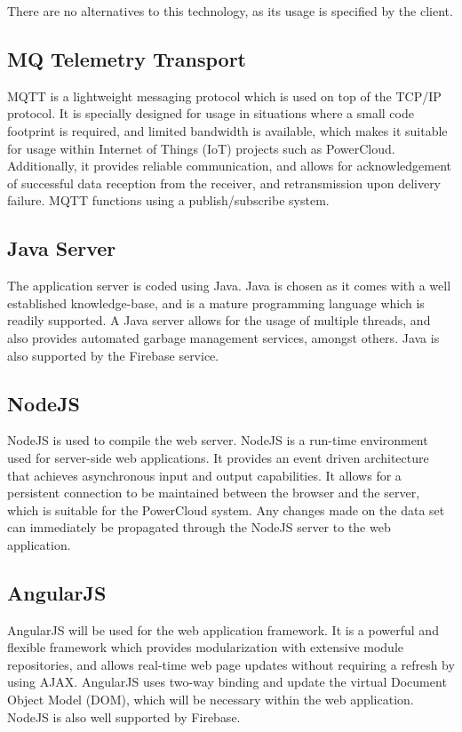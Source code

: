 \documentclass{article}
\begin{document}
	\noindent
	There are no alternatives to this technology, as its usage is specified by the client.
	
	
	\subsection{MQ Telemetry Transport}
	
	MQTT is a lightweight messaging protocol which is used on top of the 
	TCP/IP protocol. It is specially designed for usage in situations 
	where a small code footprint is required, and limited bandwidth is 
	available, which makes it suitable for usage within Internet of 
	Things (IoT) projects such as PowerCloud. Additionally, it provides 
	reliable communication, and allows for acknowledgement of successful 
	data reception from the receiver, and retransmission upon delivery 
	failure. MQTT functions using a publish/subscribe system.
	
	\subsection{Java Server}
	
	The application server is coded using Java. Java is chosen as it 
	comes with a well established knowledge-base, and is a mature 
	programming language which is readily supported. A Java server allows 
	for the usage of multiple threads, and also provides automated 
	garbage management services, amongst others. Java is also supported 
	by the Firebase service.
	
	\subsection{NodeJS}
	
	NodeJS is used to compile the web server. NodeJS is a run-time 
	environment used for server-side web applications. It provides an 
	event driven architecture that achieves asynchronous input and output 
	capabilities. It allows for a  persistent connection to be maintained 
	between the browser and the server, which is suitable for the 
	PowerCloud system. Any changes made on the data set can immediately 
	be propagated through the NodeJS server to the web application.
	
	\subsection{AngularJS}
	
	AngularJS will be used for the web application framework. It is a 
	powerful and flexible framework which provides modularization with 
	extensive module repositories, and allows real-time web page updates 
	without requiring a refresh by using AJAX. AngularJS uses two-way 
	binding and update the virtual Document Object Model (DOM), which 
	will be necessary within the web application. NodeJS is also well 
	supported by Firebase.
	
\end{document}
